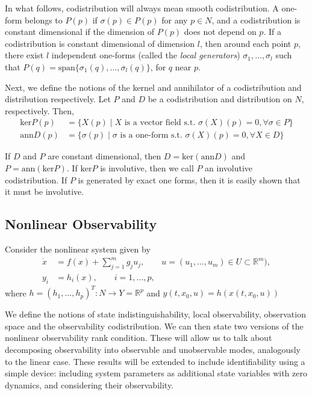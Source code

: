 \documentclass[psamsfonts]{amsart}
\theoremstyle{definition}
\theoremstyle{remark}
\newcommand*\R{\mathds{R}}
\numberwithin{equation}{section}
\begin{document}
In what follows, codistribution will always mean smooth codistribution. A one-form belongs to $P(p)$ if $\sigma(p) \in P(p)$ for any $p\in N$, and a codistribution is constant dimensional if the dimension of $P(p)$ does not depend on $p$. If a codistribution is constant dimensional of dimension $l$, then around each point $p$, there exist $l$ independent one-forms (called the \textit{local generators}) $\sigma_1, \dots, \sigma_l$ such that $P(q) = \text{span}\{\sigma_1(q), \dots, \sigma_l(q)\}$, for $q$ near $p$. 

Next, we define the notions of the kernel and annihilator of a codistribution and distribution respectively. Let $P$ and $D$ be a codistribution and distribution on $N$, respectively. Then, 
\begin{equation}
    \begin{aligned}
        \text{ker}P(p) &={} \{X(p) \mid X \text{ is a vector field s.t. } \sigma(X)(p) = 0, \forall \sigma \in P\}\\
        \text{ann}D(p) &={} \{\sigma(p) \mid \sigma \text{ is a one-form s.t. } \sigma(X)(p) = 0, \forall X \in D\}
    \end{aligned}   
\end{equation}

If $D$ and $P$ are constant dimensional, then $D = \text{ker}( \text{ann} D)$ and $P = \text{ann}(\text{ker} P)$. If $\text{ker} P$ is involutive, then we call $P$ an involutive codistribution. If $P$ is generated by exact one forms, then it is easily shown that it must be involutive. 


\subsection{Nonlinear Observability}
Consider the nonlinear system given by 
\begin{equation}
    \begin{aligned}
        \dot x & = {} f(x) + \sum_{j = 1}^m g_j u_j, \qquad u = (u_1, \dots, u_m) \in U\subset \R^m), \\
        y_i & = {} h_i(x), \qquad i = 1, \dots, p,
    \end{aligned}\label{eq:system}
\end{equation}
where $h = (h_1, \dots, h_p)^T:N\rightarrow Y=\R^p$ and $y(t, x_0, u) = h(x(t, x_0, u))$

We define the notions of state indistinguishability, local observability, observation space and the observability codistribution. We can then state two versions of the nonlinear observability rank condition. These will allow us to talk about decomposing observability into observable and unobservable modes, analogously to the linear case. These results will be extended to include identifiability using a simple device: including system parameters as additional state variables with zero dynamics, and considering their observability. 
\end{document}
